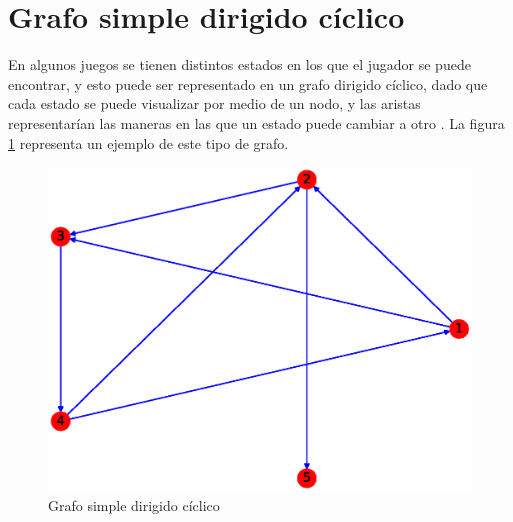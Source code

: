 \documentclass{article}
\begin{document}
\section{Grafo simple dirigido cíclico}
En algunos juegos se tienen distintos estados en los que el jugador se puede encontrar, y esto puede ser representado en un grafo dirigido cíclico, dado que cada estado se puede visualizar por medio de un nodo, y las aristas representarían las maneras en las que un estado puede cambiar a otro \cite{GSDA}. La figura \ref{fig:GSDC} representa un ejemplo de este tipo de grafo.
\begin{figure}[H]
    \includegraphics[width=\textwidth]{5-GSDC}
    \caption{Grafo simple dirigido cíclico}
    \label{fig:GSDC}
\end{figure}



\end{document}
